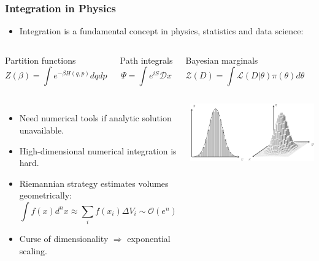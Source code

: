 \documentclass[aspectratio=169]{beamer}
\begin{document}
\begin{frame}
    \frametitle{Integration in Physics}
    \begin{itemize}
        \item Integration is a fundamental concept in physics, statistics and data science:
    \end{itemize}
    \begin{columns}
        \begin{block}{Partition functions}
            \vspace{-11pt}
            \[ Z(\beta) = \int e^{-\beta H(q,p)} dq dp \]
        \end{block}
        \begin{block}{Path integrals}
            \[ \Psi = \int e^{i S} \mathcal{D}x \]
        \end{block}
        \begin{block}{Bayesian marginals}
            \vspace{-11pt}
            \[ \mathcal{Z}(D) = \int \mathcal{L}(D|\theta) \pi(\theta) d\theta \]
        \end{block}
    \end{columns}
    \begin{columns}
        \begin{itemize}
            \item Need numerical tools if analytic solution unavailable.
            \item High-dimensional numerical integration is hard.
            \item Riemannian strategy estimates volumes geometrically:
                \[ \int f(x) d^nx \approx \sum_i f(x_i) \Delta V_i \sim \mathcal{O}(e^n) \]
            \item Curse of dimensionality $\Rightarrow$ exponential scaling.
        \end{itemize}
        \includegraphics[width=\textwidth]{figures/integration.pdf}
    \end{columns}
\end{frame}
\end{document}
